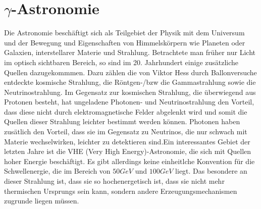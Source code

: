 \chapter{$\gamma$-Astronomie} 
\label{ch:gamma}
Die Astronomie beschäftigt sich als Teilgebiet der Physik mit dem Universum und der Bewegung und Eigenschaften von Himmelskörpern wie Planeten oder Galaxien, interstellarer Materie und Strahlung. Betrachtete man früher nur Licht im optisch sichtbaren Bereich, so sind im 20. Jahrhundert einige zusätzliche Quellen dazugekommmen. Dazu zählen die von Viktor Hess durch Ballonversuche entdeckte kosmische Strahlung, die Röntgen-/bzw die Gammastrahlung sowie die Neutrinostrahlung. Im Gegensatz zur kosmischen Strahlung, die überwiegend aus Protonen besteht, hat ungeladene Photonen- und Neutrinostrahlung den Vorteil, dass diese nicht durch elektromagnetische Felder abgelenkt wird und somit die Quellen dieser Strahlung leichter bestimmt werden können. Photonen haben zusätlich den Vorteil, dass sie im Gegensatz zu Neutrinos, die nur schwach mit Materie wechselwirken, leichter zu detektieren sind.Ein interessantes Gebiet der letzten Jahre ist die VHE (Very High Energy)-Astronomie, die sich mit Quellen hoher  Energie beschäftigt. Es gibt allerdings keine einheitlche Konvention für die Schwellenergie, die im Bereich von $50 \unit{GeV}$ \cite{TeVCat} und $100 \unit{GeV}$ \cite{DesignConcept} liegt. Das besondere an dieser Strahlung ist, dass sie so hochenergetisch ist, dass sie nicht mehr thermischen Ursprungs sein kann, sondern andere Erzeugungsmechanismen zugrunde liegen müssen.

